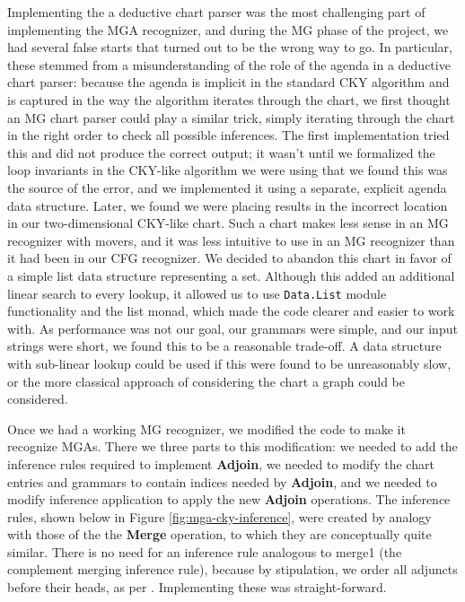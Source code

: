 \documentclass{article}
\begin{document}
Implementing the a deductive chart parser was the most challenging
part of implementing the MGA recognizer, and during the MG phase of
the project, we had several false starts that turned out to be the
wrong way to go.  In particular, these stemmed from a misunderstanding
of the role of the agenda in a deductive chart parser: because the
agenda is implicit in the standard CKY algorithm and is captured in
the way the algorithm iterates through the chart, we first thought an
MG chart parser could play a similar trick, simply iterating through
the chart in the right order to check all possible inferences.  The
first implementation tried this and did not produce the correct
output; it wasn't until we formalized the loop invariants in the
CKY-like algorithm we were using that we found this was the source of
the error, and we implemented it using a separate, explicit agenda
data structure.  Later, we found we were placing results in the
incorrect location in our two-dimensional CKY-like chart.  Such a
chart makes less sense in an MG recognizer with movers, and it was
less intuitive to use in an MG recognizer than it had been in our CFG
recognizer.  We decided to abandon this chart in favor of a simple
list data structure representing a set.  Although this added an
additional linear search to every lookup, it allowed us to use
\texttt{Data.List} module functionality and the list monad, which made
the code clearer and easier to work with.  As performance was not our
goal, our grammars were simple, and our input strings were short, we
found this to be a reasonable trade-off.  A data structure with
sub-linear lookup could be used if this were found to be unreasonably
slow, or the more classical approach of considering the chart a graph
could be considered.

Once we had a working MG recognizer, we modified the code to make it
recognize MGAs.  There we three parts to this modification: we needed
to add the inference rules required to implement \textbf{Adjoin}, we
needed to modify the chart entries and grammars to contain indices
needed by \textbf{Adjoin}, and we needed to modify inference
application to apply the new \textbf{Adjoin} operations.  The
inference rules, shown below in Figure \ref{fig:mga-cky-inference},
were created by analogy with those of the the \textbf{Merge}
operation, to which they are conceptually quite similar.  There is no
need for an inference rule analogous to merge1 (the complement merging
inference rule), because by stipulation, we order all adjuncts before
their heads, as per \cite{fowlie2015}.  Implementing these was
straight-forward.
\end{document}
